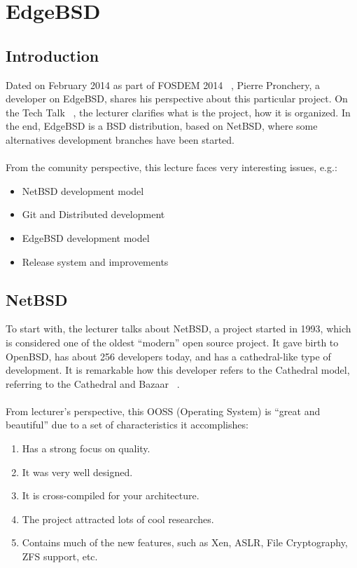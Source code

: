 \documentclass[11pt]{article}
\begin{document}
\pagebreak

\section{EdgeBSD}
\label{sec:edgebsd}
\subsection{Introduction}
Dated on February 2014 as part of FOSDEM 2014 ~\cite{FOSS00}, Pierre Pronchery, a developer on EdgeBSD, shares his perspective about this particular project. On the Tech Talk ~\cite{TALK07}, the lecturer clarifies what is the project, how it is organized. In the end, EdgeBSD is a BSD distribution, based on NetBSD, where some alternatives development branches have been started.\\
\\
From the comunity perspective, this lecture faces very interesting issues, e.g.:
\begin{itemize}
\item{NetBSD development model}
\item{Git and Distributed development}
\item{EdgeBSD development model}
\item{Release system and improvements}
\end{itemize}

\subsection{NetBSD}

To start with, the lecturer talks about NetBSD, a project started in 1993, which is considered one of the oldest ``modern'' open source project. It gave birth to OpenBSD, has about 256 developers today, and has a cathedral-like type of development. It is remarkable how this developer refers to the Cathedral model, referring to the Cathedral and Bazaar ~\cite{CATH00}.\\
\\
From lecturer's perspective, this OOSS (Operating System) is ``great and beautiful'' due to a set of characteristics it accomplishes:
\begin{enumerate}\itemsep0pt
\item{Has a strong focus on quality}.
\item{It was very well designed}.
\item{It is cross-compiled for your architecture}.
\item{The project attracted lots of cool researches}.
\item{Contains much of the new features, such as Xen, ASLR, File Cryptography, ZFS support, etc}.
\end{enumerate}\itemsep0pt
\end{document}
